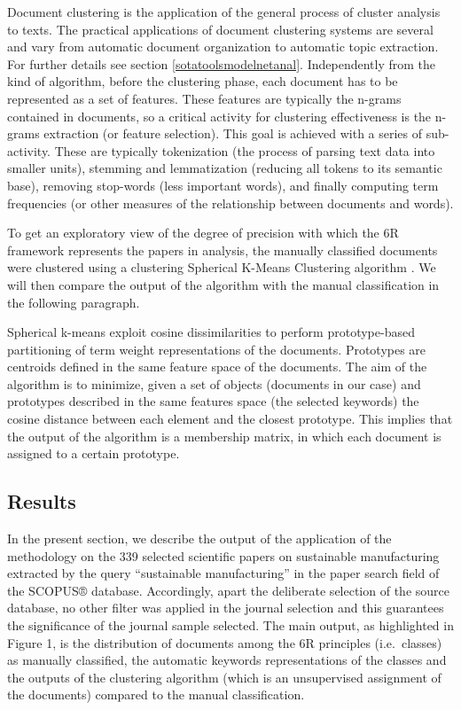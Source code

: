 \documentclass[b5paper,]{book}
\theoremstyle{definition}
\theoremstyle{definition}
\theoremstyle{definition}
\theoremstyle{remark}
\begin{document}
Document clustering is the application of the general process of cluster
analysis to texts. The practical applications of document clustering
systems are several and vary from automatic document organization to
automatic topic extraction. For further details see section
\ref{sotatoolsmodelnetanal}. Independently from the kind of algorithm,
before the clustering phase, each document has to be represented as a
set of features. These features are typically the n-grams contained in
documents, so a critical activity for clustering effectiveness is the
n-grams extraction (or feature selection). This goal is achieved with a
series of sub-activity. These are typically tokenization (the process of
parsing text data into smaller units), stemming and lemmatization
(reducing all tokens to its semantic base), removing stop-words (less
important words), and finally computing term frequencies (or other
measures of the relationship between documents and words).

To get an exploratory view of the degree of precision with which the 6R
framework represents the papers in analysis, the manually classified
documents were clustered using a clustering Spherical K-Means Clustering
algorithm \citep{buchta2012spherical}. We will then compare the output
of the algorithm with the manual classification in the following
paragraph.

Spherical k-means exploit cosine dissimilarities to perform
prototype-based partitioning of term weight representations of the
documents. Prototypes are centroids defined in the same feature space of
the documents. The aim of the algorithm is to minimize, given a set of
objects (documents in our case) and prototypes described in the same
features space (the selected keywords) the cosine distance between each
element and the closest prototype. This implies that the output of the
algorithm is a membership matrix, in which each document is assigned to
a certain prototype.

\subsection{Results}\label{results-3}

In the present section, we describe the output of the application of the
methodology on the 339 selected scientific papers on sustainable
manufacturing extracted by the query ``sustainable manufacturing'' in
the paper search field of the SCOPUS® database. Accordingly, apart the
deliberate selection of the source database, no other filter was applied
in the journal selection and this guarantees the significance of the
journal sample selected. The main output, as highlighted in Figure 1, is
the distribution of documents among the 6R principles (i.e.~classes) as
manually classified, the automatic keywords representations of the
classes and the outputs of the clustering algorithm (which is an
unsupervised assignment of the documents) compared to the manual
classification.
\end{document}

